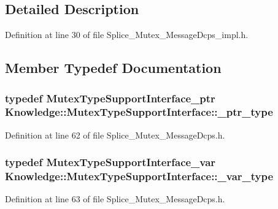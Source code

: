 \subsection{Detailed Description}


Definition at line 30 of file Splice\_\-Mutex\_\-MessageDcps\_\-impl.h.



\subsection{Member Typedef Documentation}
\hypertarget{classKnowledge_1_1MutexTypeSupportInterface_a509c42b72d1043ac6b3cdbe678335f6f}{
\subsubsection[{\_\-ptr\_\-type}]{\setlength{\rightskip}{0pt plus 5cm}typedef {\bf MutexTypeSupportInterface\_\-ptr} {\bf Knowledge::MutexTypeSupportInterface::\_\-ptr\_\-type}}}
\label{d4/df0/classKnowledge_1_1MutexTypeSupportInterface_a509c42b72d1043ac6b3cdbe678335f6f}


Definition at line 62 of file Splice\_\-Mutex\_\-MessageDcps.h.

\hypertarget{classKnowledge_1_1MutexTypeSupportInterface_a62ca1346af2778b03bf35651e06ccadf}{
\subsubsection[{\_\-var\_\-type}]{\setlength{\rightskip}{0pt plus 5cm}typedef {\bf MutexTypeSupportInterface\_\-var} {\bf Knowledge::MutexTypeSupportInterface::\_\-var\_\-type}}}
\label{d4/df0/classKnowledge_1_1MutexTypeSupportInterface_a62ca1346af2778b03bf35651e06ccadf}


Definition at line 63 of file Splice\_\-Mutex\_\-MessageDcps.h.



